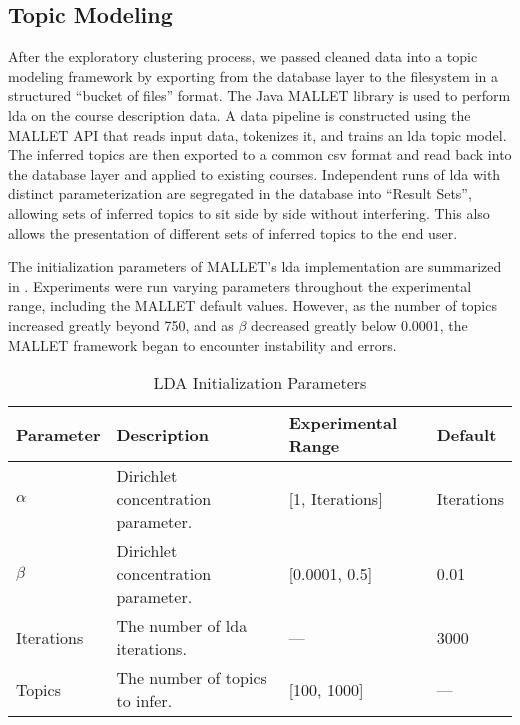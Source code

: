 
\subsection{Topic Modeling}
\label{sec:topic-modeling}

After the exploratory clustering process, we passed cleaned data into a topic modeling framework by exporting from the database layer to the filesystem in a structured ``bucket of files'' format.
The Java MALLET library is used to perform \ac{lda} on the course description data.
A data pipeline is constructed using the MALLET API that reads input data, tokenizes it, and trains an \ac{lda} topic model.
The inferred topics are then exported to a common \ac{csv} format and read back into the database layer and applied to existing courses.
Independent runs of \ac{lda} with distinct parameterization are segregated in the database into ``Result Sets'', allowing sets of inferred topics to sit side by side without interfering.
This also allows the presentation of different sets of inferred topics to the end user.


The initialization parameters of MALLET's \ac{lda} implementation are summarized in .
Experiments were run varying parameters throughout the experimental range, including the MALLET default values.
However, as the number of topics increased greatly beyond 750, and as $\beta$ decreased greatly below 0.0001, the MALLET framework began to encounter instability and errors.


\begin{table*}[ht]
\centering
\begin{tabular}{llll}
\toprule
Parameter  & Description & Experimental Range & Default \\
\midrule
$\alpha$   & Dirichlet concentration parameter. & [1, Iterations] & Iterations \\
$\beta$    & Dirichlet concentration parameter. & [0.0001, 0.5] & 0.01 \\
Iterations & The number of \ac{lda} iterations. & --- & 3000 \\
Topics     & The number of topics to infer. & [100, 1000] & --- \\
\bottomrule
\end{tabular}
\caption{LDA Initialization Parameters\label{table:lda-parameters}}
\end{table*}

